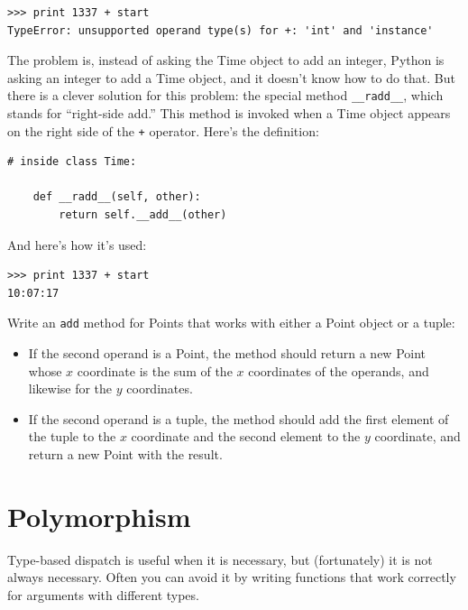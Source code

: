 \documentclass[10pt]{book}
\begin{document}
\begin{CJK}{UTF8}{gbsn}
\begin{verbatim}
>>> print 1337 + start
TypeError: unsupported operand type(s) for +: 'int' and 'instance'
\end{verbatim}
%
The problem is, instead of asking the Time object to add an integer,
Python is asking an integer to add a Time object, and it doesn't know
how to do that.  But there is a clever solution for this problem: the
special method \verb"__radd__", which stands for ``right-side add.''
This method is invoked when a Time object appears on the right side of
the {\tt +} operator.  Here's the definition:

\begin{verbatim}
# inside class Time:

    def __radd__(self, other):
        return self.__add__(other)
\end{verbatim}
%
And here's how it's used:

\begin{verbatim}
>>> print 1337 + start
10:07:17
\end{verbatim}
%

\begin{exercise}

Write an {\tt add} method for Points that works with either a
Point object or a tuple:  

\begin{itemize}

\item If the second operand is a Point, the method should return a new
Point whose $x$ coordinate is the sum of the $x$ coordinates of the
operands, and likewise for the $y$ coordinates.

\item If the second operand is a tuple, the method should add the
first element of the tuple to the $x$ coordinate and the second
element to the $y$ coordinate, and return a new Point with the result. 

\end{itemize}

\end{exercise}

\section{Polymorphism}

Type-based dispatch is useful when it is necessary, but (fortunately)
it is not always necessary.  Often you can avoid it by writing functions
that work correctly for arguments with different types.


\end{CJK}
\end{document}
